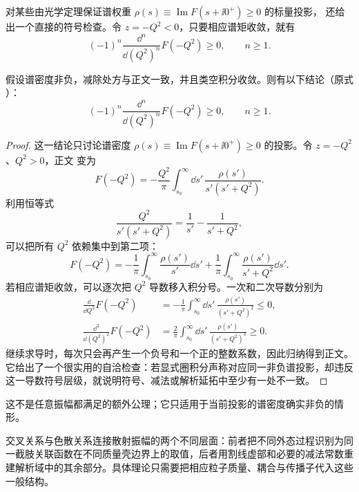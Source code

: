 对某些由光学定理保证谱权重 $\rho(s)\equiv\operatorname{Im}F(s+\ii0^+)\ge0$ 的标量投影， 还给出一个直接的符号检查。令 $z=-Q^2<0$，只要相应谱矩收敛，就有
\begin{equation}
 \boxed{
 (-1)^n\frac{\dd^n}{\dd(Q^2)^n}F(-Q^2)\ge0,
 \qquad n\ge1.}
 \label{eq:spacelike-spectral-positivity-dp68}
\end{equation}

\begin{proposition}[正谱测度的类空响应符号]
假设谱密度非负，减除处方与正文一致，并且类空积分收敛。则有以下结论（原式 ）：
\begin{equation*}
 \boxed{
 (-1)^n\frac{\dd^n}{\dd(Q^2)^n}F(-Q^2)\ge0,
 \qquad n\ge1.}
\end{equation*}
\end{proposition}
\begin{proof}
这一结论只讨论谱密度 $\rho(s)\equiv\operatorname{Im}F(s+\ii0^+)\ge0$ 的投影。令 $z=-Q^2$、$Q^2>0$，正文 变为
\begin{equation*}
F(-Q^2)
=-\frac{Q^2}{\pi}
\int_{s_0}^{\infty}\dd s'\,
\frac{\rho(s')}{s'(s'+Q^2)}.
\end{equation*}
利用恒等式
\begin{equation*}
\frac{Q^2}{s'(s'+Q^2)}
=\frac1{s'}-\frac1{s'+Q^2},
\end{equation*}
可以把所有 $Q^2$ 依赖集中到第二项：
\begin{equation*}
F(-Q^2)
=-\frac1\pi\int_{s_0}^{\infty}\frac{\rho(s')}{s'}\dd s'
+\frac1\pi\int_{s_0}^{\infty}\frac{\rho(s')}{s'+Q^2}\dd s'.
\end{equation*}
若相应谱矩收敛，可以逐次把 $Q^2$ 导数移入积分号。一次和二次导数分别为
\begin{align*}
\frac{\dd}{\dd Q^2}F(-Q^2)
&=-\frac1\pi\int_{s_0}^{\infty}\dd s'\,
\frac{\rho(s')}{(s'+Q^2)^2}\le0,\\
\frac{\dd^2}{\dd(Q^2)^2}F(-Q^2)
&=\frac{2}{\pi}\int_{s_0}^{\infty}\dd s'\,
\frac{\rho(s')}{(s'+Q^2)^3}\ge0.
\end{align*}
继续求导时，每次只会再产生一个负号和一个正的整数系数，因此归纳得到正文。它给出了一个很实用的自洽检查：若显式圈积分声称对应同一非负谱投影，却违反这一导数符号层级，就说明符号、减法或解析延拓中至少有一处不一致。
\end{proof}

这不是任意振幅都满足的额外公理；它只适用于当前投影的谱密度确实非负的情形。

交叉关系与色散关系连接散射振幅的两个不同层面：前者把不同外态过程识别为同一截肢关联函数在不同质量壳边界上的取值，后者用割线虚部和必要的减法常数重建解析域中的其余部分。具体理论只需要把相应粒子质量、耦合与传播子代入这些一般结构。


